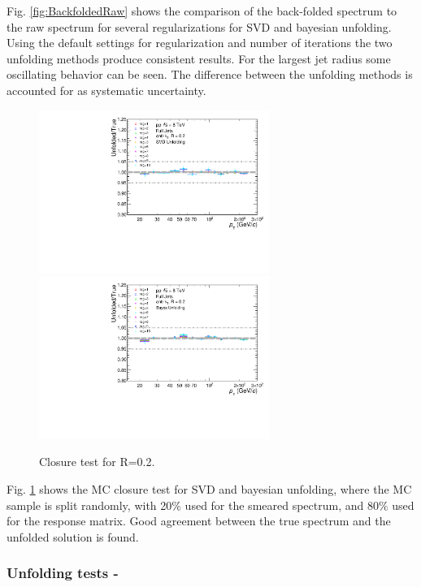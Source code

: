 Fig. \ref{fig:BackfoldedRaw} shows the comparison of the back-folded spectrum to the raw spectrum for several regularizations for SVD and bayesian unfolding. Using the default settings for regularization and number of iterations the two unfolding methods produce consistent results. For the largest jet radius some oscillating behavior can be seen. The difference between the unfolding methods is accounted for as systematic uncertainty.

\begin{figure}
    \centering
    \begin{multicols}{2}
            \includegraphics[width=7.5cm]{figures/UnfoldingComparisons/Closure/RatioClosure1DSvd_R02.pdf}
        \vfill\null
        \columnbreak
            \includegraphics[width=7.5cm]{figures/UnfoldingComparisons/Closure/RatioClosure1DBayes_R02.pdf}
        \vfill\null
    \end{multicols}
    \caption{Closure test for R=0.2.}
    \label{fig:Closure}
\end{figure}

Fig. \ref{fig:Closure} shows the MC closure test for SVD and bayesian unfolding, where the MC sample is split randomly, with 20$\%$ used for the smeared spectrum, and 80$\%$ used for the response matrix. Good agreement between the true spectrum and the unfolded solution is found.

\subsubsection{Unfolding tests - \pPb}

